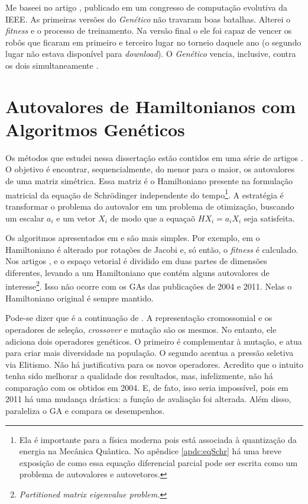 	Me baseei no artigo \cite{robocodeGA}, publicado em um congresso de computação evolutiva da IEEE. As primeiras versões do \emph{Genético} não travaram boas batalhas. Alterei o \emph{fitness} e o processo de treinamento. Na versão final o ele foi capaz de vencer os robôs que ficaram em primeiro e terceiro lugar no torneio daquele ano (o segundo lugar não estava disponível para \emph{download}). O \emph{Genético} vencia, inclusive, contra os dois simultaneamente \cite{robocodeGA_adriano}.
	
\section{Autovalores de Hamiltonianos com Algoritmos Genéticos\label{sec:metodo}}

	Os métodos que estudei nessa dissertação estão contidos em uma série de artigos \cite{metodo2002, metodo2004, metodo2006, metodo2008, metodo2009, metodo2011}. O objetivo é encontrar, sequencialmente, do menor para o maior, os autovalores de uma matriz simétrica. Essa matriz é o Hamiltoniano presente na formulação matricial da equação de Schrödinger independente do tempo\footnote{Ela é importante para a física moderna pois está associada à quantização da energia na Mecânica Quântica. No apêndice \ref{apdc:eqSchr} há uma breve exposição de como essa equação diferencial parcial pode ser escrita como um problema de autovalores e autovetores.}. A estratégia é transformar o problema do autovalor em um problema de otimização, buscando um escalar $a_i$ e um vetor $X_i$ de modo que a equaçaõ $HX_i = a_iX_i$ seja satisfeita.
	
	Os algoritmos apresentados em \cite{metodo2004} e \cite{metodo2011} são mais simples. Por exemplo, em \cite{metodo2002} o Hamiltoniano é alterado por rotações de Jacobi e, só então, o \emph{fitness} é calculado. Nos artigos \cite{metodo2006}, \cite{metodo2008} e \cite{metodo2009} o espaço vetorial é dividido em duas partes de dimensões diferentes, levando a um Hamiltoniano que contém alguns autovalores de interesse\footnote{\emph{Partitioned matrix eigenvalue problem.}}. Isso não ocorre com os GAs das publicações de 2004 e 2011. Nelas o Hamiltoniano original é sempre mantido.
	
	Pode-se dizer que \cite{metodo2011} é a continuação de \cite{metodo2004}. A representação cromossomial e os operadores de seleção, \emph{crossover} e mutação são os mesmos. No entanto, ele adiciona dois operadores genéticos. O primeiro é complementar à mutação, e atua para criar mais diversidade na população. O segundo acentua a pressão seletiva via Elitismo. Não há justificativa para os novos operadores. Acredito que o intuito tenha sido melhorar a qualidade dos resultados, mas, infelizmente, não há comparação com os obtidos em 2004. E, de fato, isso seria impossível, pois em 2011 há uma mudança drástica: a função de avaliação foi alterada. Além disso, \cite{metodo2011} paraleliza o GA e compara os desempenhos.
	
